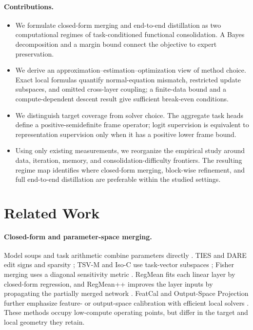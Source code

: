 \documentclass[letterpaper]{article} %
\theoremstyle{plain}
\theoremstyle{definition}
\begin{document}
\paragraph{Contributions.}
\begin{itemize}
    \item We formulate closed-form merging and end-to-end distillation as two
computational regimes of task-conditioned functional consolidation.
A Bayes decomposition and a margin bound connect the objective to expert preservation.
    \item We derive an approximation--estimation--optimization view of method choice.
Exact local formulas quantify normal-equation mismatch, restricted update subspaces, and omitted cross-layer coupling; a finite-data bound and a compute-dependent descent result give sufficient break-even conditions.
    \item We distinguish target coverage from solver choice. The aggregate task heads
define a positive-semidefinite frame operator; logit supervision is equivalent to representation supervision only when it has a positive lower frame bound.
    \item Using only existing measurements, we reorganize the empirical study around
data, iteration, memory, and consolidation-difficulty frontiers.
The resulting regime map identifies where closed-form merging, block-wise refinement, and full end-to-end distillation are preferable within the studied settings.
\end{itemize}

\section{Related Work}
\label{sec:related}

\paragraph{Closed-form and parameter-space merging.}
Model soups and task arithmetic combine parameters directly \citep{wortsman2022modelsoups,ilharco2023taskarithmetic}.
TIES and DARE edit signs and sparsity \citep{yadav2023ties,yu2024dare}; TSV-M and Iso-C use task-vector subspaces \citep{gargiulo2025tsvm,marczak2025isotropic}; Fisher merging uses a diagonal sensitivity metric \citep{matena2022fisher}.
RegMean fits each linear layer by closed-form regression, and RegMean++ improves the layer inputs by propagating the partially merged network \citep{jin2023regmean,regmeanplusplus2025}.
FeatCal and Output-Space Projection further emphasize feature- or output-space calibration with efficient local solvers \citep{featcal2026,outputprojection2026}.
These methods occupy low-compute operating points, but differ in the target and local geometry they retain.
\end{document}
